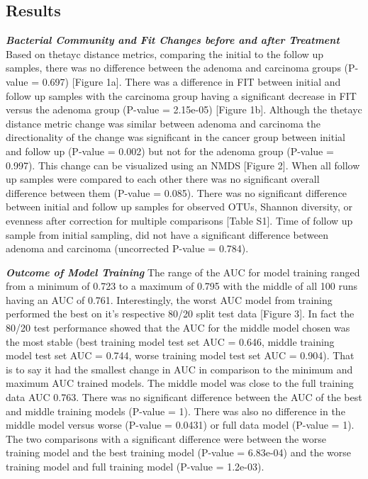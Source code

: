 \documentclass[12pt,]{article}
\begin{document}
\newpage

\subsection{Results}\label{results}

\textbf{\emph{Bacterial Community and Fit Changes before and after
Treatment}} Based on thetayc distance metrics, comparing the initial to
the follow up samples, there was no difference between the adenoma and
carcinoma groups (P-value = 0.697) {[}Figure 1a{]}. There was a
difference in FIT between initial and follow up samples with the
carcinoma group having a significant decrease in FIT versus the adenoma
group (P-value = 2.15e-05) {[}Figure 1b{]}. Although the thetayc
distance metric change was similar between adenoma and carcinoma the
directionality of the change was significant in the cancer group between
initial and follow up (P-value = 0.002) but not for the adenoma group
(P-value = 0.997). This change can be visualized using an NMDS {[}Figure
2{]}. When all follow up samples were compared to each other there was
no significant overall difference between them (P-value = 0.085). There
was no significant difference between initial and follow up samples for
observed OTUs, Shannon diversity, or evenness after correction for
multiple comparisons {[}Table S1{]}. Time of follow up sample from
initial sampling, did not have a significant difference between adenoma
and carcinoma (uncorrected P-value = 0.784).

\textbf{\emph{Outcome of Model Training}} The range of the AUC for model
training ranged from a minimum of 0.723 to a maximum of 0.795 with the
middle of all 100 runs having an AUC of 0.761. Interestingly, the worst
AUC model from training performed the best on it's respective 80/20
split test data {[}Figure 3{]}. In fact the 80/20 test performance
showed that the AUC for the middle model chosen was the most stable
(best training model test set AUC = 0.646, middle training model test
set AUC = 0.744, worse training model test set AUC = 0.904). That is to
say it had the smallest change in AUC in comparison to the minimum and
maximum AUC trained models. The middle model was close to the full
training data AUC 0.763. There was no significant difference between the
AUC of the best and middle training models (P-value = 1). There was also
no difference in the middle model versus worse (P-value = 0.0431) or
full data model (P-value = 1). The two comparisons with a significant
difference were between the worse training model and the best training
model (P-value = 6.83e-04) and the worse training model and full
training model (P-value = 1.2e-03).
\end{document}
